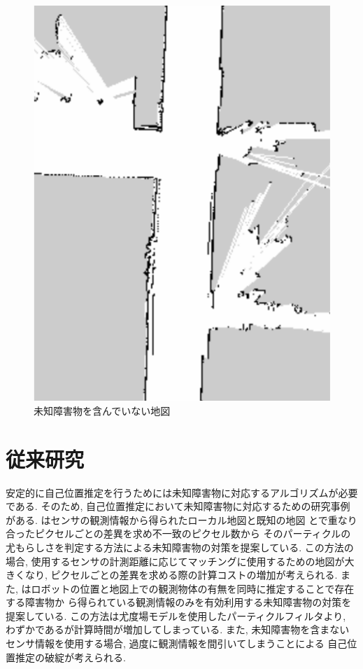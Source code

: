 \begin{figure}[htbp]
\begin{minipage}[b]{0.5\linewidth}
    \includegraphics[keepaspectratio, scale=0.32]{figs/known_obstacles.png}
    \caption{未知障害物を含んでいない地図}
    \label{fig:known-obstacles}
  \end{minipage}
\end{figure}


\section{従来研究}

安定的に自己位置推定を行うためには未知障害物に対応するアルゴリズムが必要である.
そのため, 自己位置推定において未知障害物に対応するための研究事例\cite{富沢2012}\cite{赤井2019}がある. 
\cite{富沢2012}はセンサの観測情報から得られたローカル地図と既知の地図
とで重なり合ったピクセルごとの差異を求め不一致のピクセル数から
そのパーティクルの尤もらしさを判定する方法による未知障害物の対策を提案している. 
この方法の場合, 使用するセンサの計測距離に応じてマッチングに使用するための地図が大きくなり, 
ピクセルごとの差異を求める際の計算コストの増加が考えられる. 
また, \cite{赤井2019}はロボットの位置と地図上での観測物体の有無を同時に推定することで存在する障害物か
ら得られている観測情報のみを有効利用する未知障害物の対策を提案している. 
この方法は尤度場モデルを使用したパーティクルフィルタより, わずかであるが計算時間が増加してしまっている. 
また, 未知障害物を含まないセンサ情報を使用する場合, 過度に観測情報を間引いてしまうことによる
自己位置推定の破綻が考えられる. 

